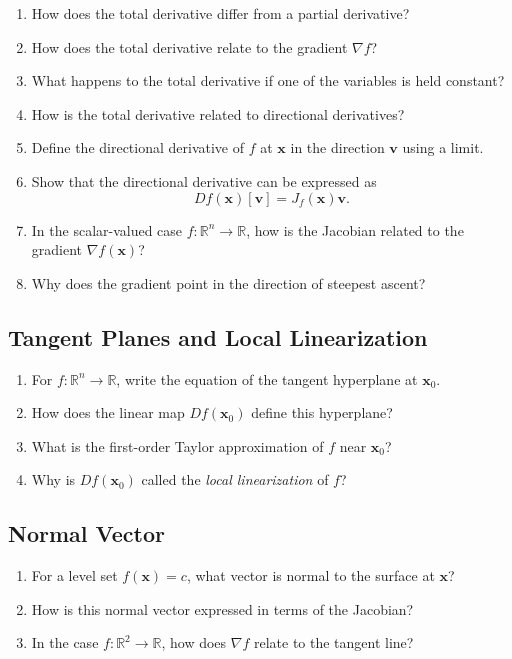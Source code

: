 \begin{enumerate}[resume]
  \item How does the total derivative differ from a partial derivative?
  \item How does the total derivative relate to the gradient \(\nabla f\)?
  \item What happens to the total derivative if one of the variables is held constant?
  \item How is the total derivative related to directional derivatives?
  \item Define the directional derivative of \(f\) at \(\mathbf{x}\) in the direction \(\mathbf{v}\) using a limit.
  \item Show that the directional derivative can be expressed as
    \[ Df(\mathbf{x})[\mathbf{v}] = J_{f}(\mathbf{x}) \mathbf{v}. \]
  \item In the scalar-valued case \(f : \mathbb{R}^{n} \to \mathbb{R}\), how is the Jacobian related to the gradient \(\nabla f(\mathbf{x})\)?
  \item Why does the gradient point in the direction of steepest ascent?
\end{enumerate}

\subsection{Tangent Planes and Local Linearization}

\begin{enumerate}[resume]
  \item For \(f : \mathbb{R}^{n} \to \mathbb{R}\), write the equation of the tangent hyperplane at \(\mathbf{x}_{0}\).
  \item How does the linear map \(Df(\mathbf{x}_{0})\) define this hyperplane?
  \item What is the first-order Taylor approximation of \(f\) near \(\mathbf{x}_{0}\)?
  \item Why is \(Df(\mathbf{x}_{0})\) called the \emph{local linearization} of \(f\)?
\end{enumerate}

\subsection{Normal Vector}

\begin{enumerate}[resume]
  \item For a level set \(f(\mathbf{x}) = c\), what vector is normal to the surface at \(\mathbf{x}\)?
  \item How is this normal vector expressed in terms of the Jacobian?
  \item In the case \(f : \mathbb{R}^{2} \to \mathbb{R}\), how does \(\nabla f\) relate to the tangent line?
\end{enumerate}

